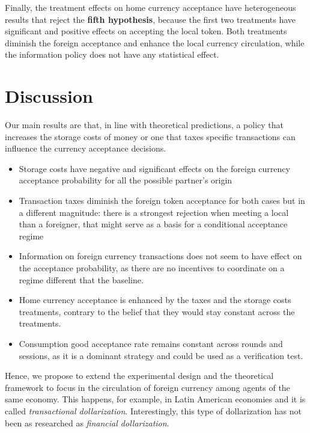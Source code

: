 Finally, the treatment effects on home currency acceptance have heterogeneous results that reject the \textbf{fifth hypothesis}, because the first two treatments have significant and positive effects on accepting the local token. Both treatments diminish the foreign acceptance and enhance the local currency circulation, while the information policy does not have any statistical effect.  




\section{Discussion} 

Our main results are that, in line with theoretical predictions, a policy that increases the storage costs of money or one that taxes specific transactions can influence the currency acceptance decisions. 

\begin{itemize}
    \item Storage costs have negative and significant effects on the foreign currency acceptance probability for all the possible partner's origin
    \item Transaction taxes diminish the foreign token acceptance for both cases but in a different magnitude: there is a strongest rejection when meeting a local than a foreigner, that might serve as a basis for a conditional acceptance regime
    \item Information on foreign currency transactions does not seem to have effect on the acceptance probability, as there are no incentives to coordinate on a regime different that the baseline.
    \item Home currency acceptance is enhanced by the taxes and the storage costs treatments, contrary to the belief that they would stay constant across the treatments.
    \item Consumption good acceptance rate remains constant across rounds and sessions, as it is a dominant strategy and could be used as a verification test.
\end{itemize}


Hence, we propose to extend the experimental design and the theoretical framework to focus in the circulation of foreign currency among agents of the same economy. This happens, for example, in Latin American economies and it is called \textit{transactional dollarization}. Interestingly, this type of dollarization has not been as researched as \textit{financial dollarization}. \citep{RePEc:imf:imfwpa:05/187, armas16}  %

